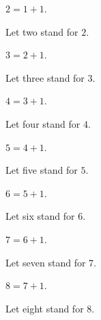 \documentclass[10pt]{article}
\begin{document}
  \begin{forthel}
    \begin{definition}[id=ARITHMETIC_01_4584236572999680,printid]
      $2 = 1 + 1$.
    \end{definition}

    Let two stand for $2$.
  \end{forthel}

  \begin{forthel}
    \begin{definition}[id=ARITHMETIC_01_3836725109456896,printid]
      $3 = 2 + 1$.
    \end{definition}

    Let three stand for $3$.
  \end{forthel}

  \begin{forthel}
    \begin{definition}[id=ARITHMETIC_01_1709884968009728,printid]
      $4 = 3 + 1$.
    \end{definition}

    Let four stand for $4$.
  \end{forthel}

  \begin{forthel}
    \begin{definition}[id=ARITHMETIC_01_6734726333202432,printid]
      $5 = 4 + 1$.
    \end{definition}

    Let five stand for $5$.
  \end{forthel}

  \begin{forthel}
    \begin{definition}[id=ARITHMETIC_01_949139189792768,printid]
      $6 = 5 + 1$.
    \end{definition}

    Let six stand for $6$.
  \end{forthel}

  \begin{forthel}
    \begin{definition}[id=ARITHMETIC_01_7245471749767168,printid]
      $7 = 6 + 1$.
    \end{definition}

    Let seven stand for $7$.
  \end{forthel}

  \begin{forthel}
    \begin{definition}[id=ARITHMETIC_01_5658172888973312,printid]
      $8 = 7 + 1$.
    \end{definition}

    Let eight stand for $8$.
  \end{forthel}
\end{document}
